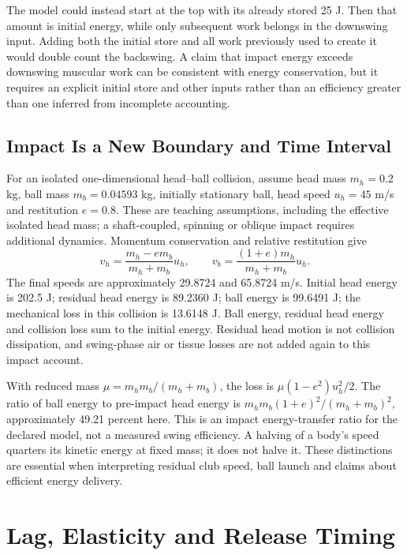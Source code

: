 The model could instead start at the top with its already stored 25 J. Then
that amount is initial energy, while only subsequent work belongs in the
downswing input. Adding both the initial store and all work previously used to
create it would double count the backswing. A claim that impact energy exceeds
downswing muscular work can be consistent with energy conservation, but it
requires an explicit initial store and other inputs rather than an efficiency
greater than one inferred from incomplete accounting.

\subsection{Impact Is a New Boundary and Time Interval}

For an isolated one-dimensional head--ball collision, assume head mass
$m_h=0.2$ kg, ball mass $m_b=0.04593$ kg, initially stationary ball, head speed
$u_h=45$ m/s and restitution $e=0.8$. These are teaching assumptions, including
the effective isolated head mass; a shaft-coupled, spinning or oblique impact
requires additional dynamics. Momentum conservation and relative restitution give
\begin{equation}
v_h=\frac{m_h-e m_b}{m_h+m_b}u_h,
\qquad v_b=\frac{(1+e)m_h}{m_h+m_b}u_h.
\label{eq:energy_collision_speeds}
\end{equation}
The final speeds are approximately 29.8724 and 65.8724 m/s. Initial head energy
is 202.5 J; residual head energy is 89.2360 J; ball energy is 99.6491 J; the
mechanical loss in this collision is 13.6148 J. Ball energy, residual head
energy and collision loss sum to the initial energy. Residual head motion is
not collision dissipation, and swing-phase air or tissue losses are not added
again to this impact account.

With reduced mass $\mu=m_hm_b/(m_h+m_b)$, the loss is
$\mu(1-e^2)u_h^2/2$. The ratio of ball energy to pre-impact head energy is
$m_hm_b(1+e)^2/(m_h+m_b)^2$, approximately 49.21 percent here. This is an impact
energy-transfer ratio for the declared model, not a measured swing efficiency.
A halving of a body's speed quarters its kinetic energy at fixed mass; it does
not halve it. These distinctions are essential when interpreting residual
club speed, ball launch and claims about efficient energy delivery.

\section{Lag, Elasticity and Release Timing}
\label{sec:lag_energy_storage}


